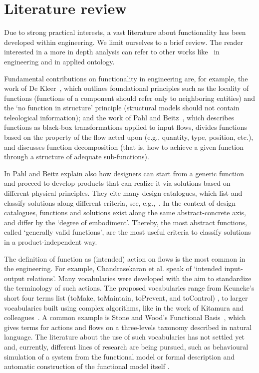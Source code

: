 \documentclass[sw]{iosart2x}
\newcommand{\quotes}[1]{`#1'}
\begin{document}
\section{Literature review\label{sec:review}} 
Due to strong practical interests, a vast literature about functionality has been developed within engineering. 
We limit ourselves to a brief review. The reader interested in a more in depth analysis can refer to other works like~\cite{erdenReviewFunctionModeling2008} in engineering and \cite{artigaNewPerspectiveOnFunctions} in applied ontology.

Fundamental contributions on functionality in engineering are, for example, the work of De Kleer~\cite{de_kleer_how_1984, kleer_qualitative_1984}, which outlines foundational principles such as the locality of functions (functions of a component should refer only to neighboring entities) and the \quotes{no function in structure} principle (structural models should not contain teleological information); and the work of Pahl and Beitz~\cite{pahl_engineering_2007}, which describes functions as black-box transformations applied to input flows, divides functions based on the property of the flow acted upon (e.g., quantity, type, position, etc.), and discusses function decomposition (that is, how to achieve a given function through a structure of adequate sub-functions).

In \cite{pahl_engineering_2007} Pahl and Beitz explain also how designers can start from a generic function and proceed to develop products that can realize it via solutions based on different physical principles. 
They cite many design catalogues, which list and classify solutions along different criteria, see, e.g.,~\cite{rothKonstruierenMitKonstruktionskatalogen2000}.
In the context of design catalogues, functions and solutions exist along the same abstract-concrete axis, and differ by the \quotes{degree of embodiment}. 
Thereby, the most abstract functions, called \quotes{generally valid functions}, are the most useful criteria to classify solutions in a product-independent way. 

The definition of function as (intended) action on flows is the most common in the engineering. For example, Chandrasekaran et al. \cite{chandrasekaranFunctionalRepresentationDesign1993} speak of \quotes{intended input-output relations}. Many vocabularies were developed with the aim to standardize the terminology of such actions. 
The proposed vocabularies range from Keuneke's short four terms list (toMake, toMaintain, toPrevent, and toControl) \cite{keuneke_device_1991}, to larger vocabularies built using complex algorithms, like in the work of Kitamura and colleagues~\cite{kitamuraFunctionalConceptOntology2002a}. 
A common example is Stone and Wood's Functional Basis~\cite{hirtz_functional_2002, stone_development_2000}, which gives terms for actions and flows on a three-levels taxonomy described in natural language.
The literature about the use of such vocabularies has not settled yet and, currently, different lines of research are being pursued, such as behavioural simulation of a system from the functional model \cite{kurtogluGraphBasedFaultIdentification2008} or formal description and automatic construction of the functional model itself \cite{gill_logic_2021,kurtoglu_automating_2010}.
\end{document}

